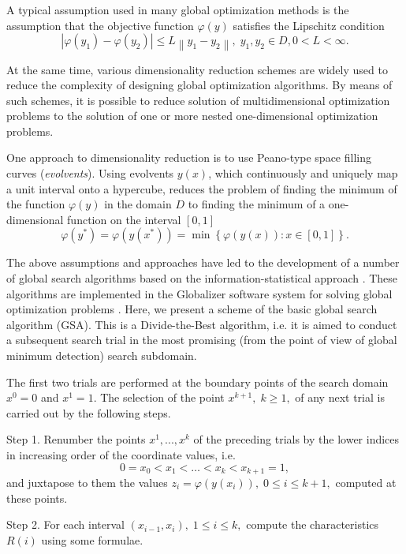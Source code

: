 \documentclass{aip-cp}
\begin{document}
A typical assumption used in many global optimization methods \cite{Evtushenko2013,Jones2009,Zilinskas2010,Pinter1996} is the assumption that the objective function $\varphi(y)$ satisfies the Lipschitz condition
\[
\left|\varphi(y_1)-\varphi(y_2)\right|\leq L\left\|y_1-y_2\right\|,\; y_1,y_2 \in D, 0<L<\infty.
\]

At the same time, various dimensionality reduction schemes are widely used to reduce the complexity of designing global optimization algorithms. By means of  such schemes, it is possible to reduce solution of multidimensional optimization problems to the solution of one or more nested one-dimensional optimization problems.

One approach to dimensionality reduction is to use Peano-type space filling curves (\textit{evolvents}). Using evolvents $y(x)$, which continuously and uniquely map a unit interval onto a hypercube, reduces the problem of finding the minimum of the function $\varphi(y)$ in the domain $D$ to finding the minimum of a one-dimensional function  on the interval $[0,1]$
\[
\varphi(y^\ast)=\varphi(y(x^\ast))=\min{\left\{\varphi(y(x)): x\in[0,1]\right\}}.
\]

The above assumptions and approaches have led to the development of a number of global search algorithms based on the information-statistical approach \cite{Strongin2000}. These algorithms are implemented in the Globalizer software system for solving global optimization problems \cite{globalizerSystem}. Here, we present a scheme of the basic global search algorithm (GSA). This is a Divide-the-Best algorithm, i.e. it is aimed to conduct a subsequent search trial in the most promising (from the point of view of global minimum detection) search subdomain.

The first two trials are performed at the boundary points of the search domain $x^0 = 0$ and $x^1 = 1$. The selection of the point  $x^{k+1}, \; k \geq 1,$  of any next trial is carried out by the following steps.

Step 1. Renumber the points  $x^1,...,x^k$ of the preceding trials by the lower indices in increasing order of the coordinate values, i.e.
\begin{equation}\label{x_i}
0=x_0<x_1<\dots <x_k<x_{k+1}=1,
\end{equation}
and juxtapose to them the values $z_i=\varphi(y(x_i)), \; 0 \leq i\leq k+1,$  computed at these points.

Step 2. For each interval $(x_{i-1},x_i), \; 1\leq i \leq k,$ compute the characteristics $R(i)$ using some formulae.
\end{document}
